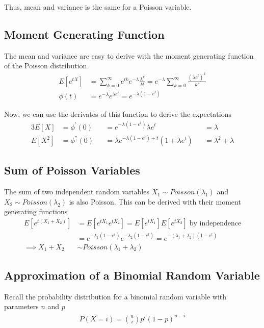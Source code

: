 \documentclass[../../probability-notes.tex]{subfiles}
\begin{document}
    Thus, mean and variance is the same for a Poisson variable.

    \subsection{Moment Generating Function}
    The mean and variance are easy to derive with the moment generating function of the Poisson distribution
    \begin{align*}
        E[e^{tX}] &= \sum_{k=0}^{\infty} e^{tk} e^{-\lambda} \frac{\lambda^{k}}{k!} = e^{-\lambda} \sum_{k=0}^{\infty} \frac{(\lambda e^{t})^{k}}{k!}\\
        \phi(t) &= e^{-\lambda} e^{\lambda e^{t}} = e^{-\lambda(1-e^{t})}
    \end{align*}

    Now, we can use the derivates of this function to derive the expectations
    \begin{alignat*}{3}
        E[X] &= \phi^{'}(0) &&= e^{-\lambda(1-e^{t})} \lambda e^{t} &&= \lambda\\
        E[X^{2}] &= \phi^{''}(0) &&= \lambda e^{-\lambda(1-e^{t}) + t} (1+\lambda e^{t}) &&= \lambda^{2} + \lambda
    \end{alignat*}

    \subsection{Sum of Poisson Variables}
    The sum of two independent random variables $X_{1} \sim Poisson(\lambda_{1})$ and $X_{2} \sim Poisson(\lambda_{2})$ is also Poisson. This can be derived with their moment generating functions
    \begin{align*}
        E[e^{t(X_{1} + X_{2})}] &= E[e^{tX_{1}} e^{tX_{2}}] = E[e^{tX_{1}}]E[e^{tX_{2}}] \;\text{by independence}\\
        &= e^{-\lambda_{1}(1-e^{t})} e^{-\lambda_{2}(1-e^{t})} = e^{-(\lambda_{1} + \lambda_{2})(1-e^{t})}\\
        \implies X_{1} + X_{2} &\sim Poisson(\lambda_{1} + \lambda_{2})
    \end{align*}

    \subsection{Approximation of a Binomial Random Variable}
    Recall the probability distribution for a binomial random variable with parameters $n$ and $p$
    \begin{align*}
        P(X = i) = \binom{n}{i} p^{i} (1-p)^{n-i}
    \end{align*}
\end{document}
